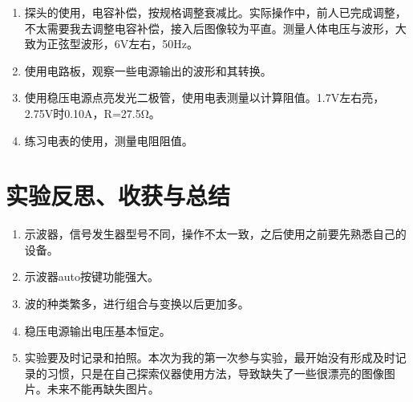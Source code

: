 \documentclass[11pt]{article}
\begin{document}
\begin{enumerate}
\begin{enumerate}
        \item 探头的使用，电容补偿，按规格调整衰减比。实际操作中，前人已完成调整，不太需要我去调整电容补偿，接入后图像较为平直。测量人体电压与波形，大致为正弦型波形，6V左右，50Hz。
        \item 使用电路板，观察一些电源输出的波形和其转换。
        \item 使用稳压电源点亮发光二极管，使用电表测量以计算阻值。1.7V左右亮，2.75V时0.10A，R=27.5Ω。
        \item 练习电表的使用，测量电阻阻值。
        


    \end{enumerate}
\end{enumerate}

\section{实验反思、收获与总结}
\begin{enumerate}
    \item 示波器，信号发生器型号不同，操作不太一致，之后使用之前要先熟悉自己的设备。
    \item 示波器auto按键功能强大。
    \item 波的种类繁多，进行组合与变换以后更加多。
    \item 稳压电源输出电压基本恒定。
    \item 实验要及时记录和拍照。本次为我的第一次参与实验，最开始没有形成及时记录的习惯，只是在自己探索仪器使用方法，导致缺失了一些很漂亮的图像图片。未来不能再缺失图片。
\end{enumerate}
\end{document}
